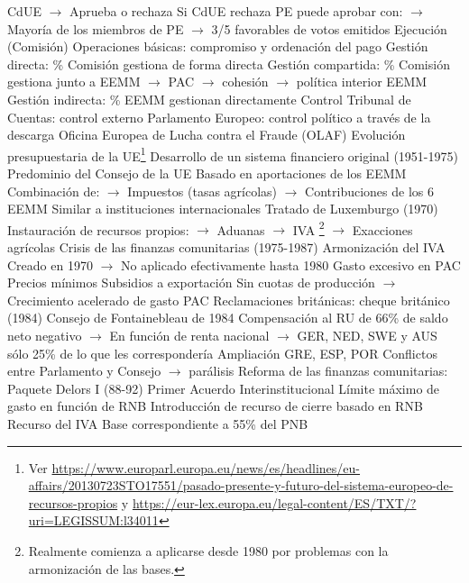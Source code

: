 \documentclass{nuevotema}
\begin{document}
\begin{esquemal}
				\4[] CdUE
				\4[] $\to$ Aprueba o rechaza
				\4[] Si CdUE rechaza PE puede aprobar con:
				\4[] $\to$ Mayoría de los miembros de PE
				\4[] $\to$ 3/5 favorables de votos emitidos
			\3 Ejecución (Comisión)
				\4 Operaciones básicas:
				\4[] compromiso y ordenación del pago
				\4 Gestión directa:
				\%
				\4[] Comisión gestiona de forma directa
				\4 Gestión compartida:
				\%
				\4[] Comisión gestiona junto a EEMM
				\4[] $\to$ PAC
				\4[] $\to$ cohesión
				\4[] $\to$ política interior EEMM
				\4 Gestión indirecta:
				\%
				\4[] EEMM gestionan directamente
			\3 Control
				\4 Tribunal de Cuentas:
				\4[] control externo
				\4 Parlamento Europeo:
				\4[] control político a través de la descarga
				\4 Oficina Europea de Lucha contra el Fraude (OLAF)
		\2 Evolución presupuestaria de la UE\footnote{Ver \url{https://www.europarl.europa.eu/news/es/headlines/eu-affairs/20130723STO17551/pasado-presente-y-futuro-del-sistema-europeo-de-recursos-propios} y \url{https://eur-lex.europa.eu/legal-content/ES/TXT/?uri=LEGISSUM:l34011}}
			\3 Desarrollo de un sistema financiero original (1951-1975)
				\4 Predominio del Consejo de la UE
				\4 Basado en aportaciones de los EEMM
				\4[] Combinación de:
				\4[] $\to$ Impuestos (tasas agrícolas)
				\4[] $\to$ Contribuciones de los 6 EEMM
				\4 Similar a instituciones internacionales
				\4 Tratado de Luxemburgo (1970)
				\4[] Instauración de recursos propios:
				\4[] $\to$ Aduanas
				\4[] $\to$ IVA \footnote{Realmente comienza a aplicarse desde 1980 por problemas con la armonización de las bases.}
				\4[] $\to$ Exacciones agrícolas
			\3 Crisis de las finanzas comunitarias (1975-1987)
				\4 Armonización del IVA
				\4[] Creado en 1970
				\4[] $\to$ No aplicado efectivamente hasta 1980
				\4 Gasto excesivo en PAC
				\4[] Precios mínimos
				\4[] Subsidios a exportación
				\4[] Sin cuotas de producción
				\4[] $\to$ Crecimiento acelerado de gasto PAC
				\4 Reclamaciones británicas: cheque británico (1984)
				\4[] Consejo de Fontainebleau de 1984
				\4[] Compensación al RU de 66\% de saldo neto negativo
				\4[] $\to$ En función de renta nacional
				\4[] $\to$ GER, NED, SWE y AUS sólo 25\% de lo que les correspondería
				\4 Ampliación GRE, ESP, POR
				\4 Conflictos entre Parlamento y Consejo $\to$ parálisis
			\3 Reforma de las finanzas comunitarias: Paquete Delors I (88-92)
				\4 Primer Acuerdo Interinstitucional
				\4 Límite máximo de gasto en función de RNB
				\4 Introducción de recurso de cierre basado en RNB
				\4 Recurso del IVA
				\4[] Base correspondiente a 55\% del PNB

\end{esquemal}
\end{document}
